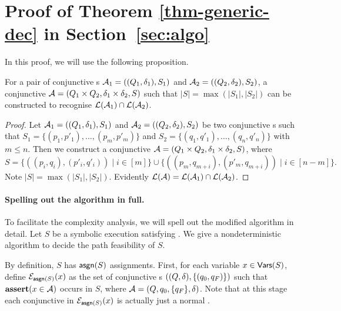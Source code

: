 
\section{Proof of Theorem \ref{thm-generic-dec} in Section~\ref{sec:algo}}\label{app:algo}

In this proof, we will use the following proposition.
\begin{proposition}\label{prop-conj-fa-prod}
For a pair of conjunctive \FA{}s $\mathcal{A}_1 = ((Q_1, \delta_1), S_1)$ and $\mathcal{A}_2 = ((Q_2, \delta_2), S_2)$, a conjunctive \FA{} $\mathcal{A} = (Q_1 \times Q_2, \delta_1 \times \delta_2, S)$ such that $|S| = \max(|S_1|, |S_2|)$ can be constructed to recognise $\mathcal{L}(\mathcal{A}_1) \cap \mathcal{L}(\mathcal{A}_2)$. 
\end{proposition}
\begin{proof}
Let $\mathcal{A}_1 = ((Q_1, \delta_1), S_1)$ and $\mathcal{A}_2 = ((Q_2, \delta_2), S_2)$ be two conjunctive \FA{}s such that $S_1 = \{(p_1, p'_1),\ldots, (p_m, p'_m)\}$ and $S_2 = \{(q_1, q'_1), \ldots, (q_n, q'_n)\}$ with $m \le n$. Then we construct a conjunctive \FA{} $\mathcal{A} = (Q_1 \times Q_2, \delta_1 \times \delta_2, S)$, where 
$$S= \{((p_i, q_i), (p'_i, q'_i)) \mid i \in [m]\} \cup \{((p_m, q_{m+i}), (p'_m, q_{m+i})) \mid i \in [n-m]\}.$$ 
Note $|S|  = \max(|S_1|, |S_2|)$. Evidently $\mathcal{L}(\mathcal{A}) = \mathcal{L}(\mathcal{A}_1) \cap \mathcal{L}(\mathcal{A}_2)$. 
\end{proof}

\paragraph{Spelling out the algorithm in full.}
To facilitate the complexity analysis, we will spell out the modified algorithm 
in detail. Let $S$ be a symbolic execution satisfying \prerec{} . 
We give a nondeterministic algorithm to decide the path feasibility of
$S$. 

By definition, $S$ has $\mathsf{asgn}(S)$ assignments.
First, for each variable $x \in \mathsf{Vars}(S)$,
define $\mathcal{E}_{\mathsf{asgn}(S)}(x)$  as the set of conjunctive \FA{}s $((Q, \delta), \{(q_0, q_F)\})$ such that $\textbf{assert}(x \in \mathcal{A})$ occurs in $S$, where $\mathcal{A}= (Q, q_0, \{q_F\}, \delta)$. 
Note that at this stage each conjunctive \FA{} in $\mathcal{E}_{\mathsf{asgn}(S)}(x)$ is 
actually just a normal \FA{}. 

